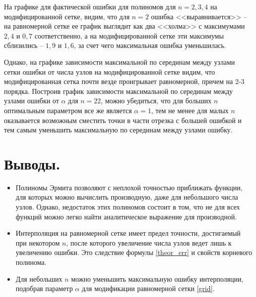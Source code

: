 \documentclass[a4paper, 12pt]{article}
\begin{document}
	На графике для фактической ошибки для полиномов для $n=2,3,4$ на модифицированной сетке, видим, что для $n=2$ ошибка <<выравнивается>> -- на равномерной сетке ее график выглядит как два <<холма>> с максимумами $2,4$ и $0,7$ соответственно, а на модифицированной сетке эти максимумы сблизились -- $1,9$ и $1,6$, за счет чего максимальная ошибка уменьшилась.
	
	Однако, на графике зависимости максимальной по серединам между узлами сетки ошибки от числа узлов на модифицированной сетке видим, что модифицированная сетка почти везде проигрывает равномерной, причем на 2-3 порядка. Построив график зависимости максимальной по серединам между узлами ошибки от $\alpha$ для $n=22$, можно убедиться, что для больших $n$ оптимальным параметром все же является $\alpha=1$, тем не менее для малых $n$ оказывается возможным сместить точки в части отрезка с большей ошибкой и тем самым уменьшить максимальную по серединам между узлами ошибку.
	
	\section{Выводы.}
	
	\begin{itemize}
		\item Полиномы Эрмита позволяют с неплохой точностью приближать функции, для которых можно вычислить производную, даже для небольшого числа узлов. Однако, недостаток этих полиномов состоит в том, что не для всех функций можно легко найти аналитическое выражение для производной.
		\item Интерполяция на равномерной сетке имеет предел точности, достигаемый при некотором $n$, после которого увеличение числа узлов ведет лишь к увеличению ошибки. Это следствие формулы \eqref{theor_err} и свойств корневого полинома.
		\item Для небольших $n$ можно уменьшить максимальную ошибку интерполяции, подобрав параметр $\alpha$ для модификации равномерной сетки \eqref{grid}.
	\end{itemize}
	
\end{document}
